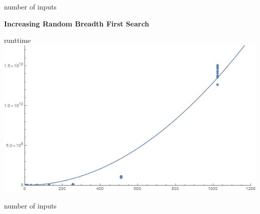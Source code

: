\documentclass[12pt]{report}
\begin{document}
\centerline{number of inputs}
\centerline{\textbf{Increasing Random Breadth First Search}}
runttime \includegraphics[scale=.5]{increasingbfs.jpg}\\
\centerline{number of inputs}
\\
\end{document}
